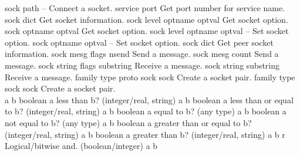 \begin{longtable}{}
\optableent
	{sock path}
	{{\bf {}}}
	{--}
	{Connect a socket.}
\hline
\optableent
	{service}
	{{\bf {}}}
	{port}
	{Get port number for service name.}
\hline
\optableent
	{sock}
	{{\bf {}}}
	{dict}
	{Get socket information.}
\hline
\optableent
	{sock level optname}
	{{\bf {}}}
	{optval}
	{Get socket option.}
\optableent
	{sock optname}
	{{\bf {}}}
	{optval}
	{Get socket option.}
\hline
\optableent
	{sock level optname optval}
	{{\bf {}}}
	{--}
	{Set socket option.}
\optableent
	{sock optname optval}
	{{\bf {}}}
	{--}
	{Set socket option.}
\hline
\optableent
	{sock}
	{{\bf {}}}
	{dict}
	{Get peer socket information.}
\hline
\optableent
	{sock mesg flags}
	{{\bf {}}}
	{nsend}
	{Send a message.}
\optableent
	{sock mesg}
	{{\bf {}}}
	{count}
	{Send a message.}
\hline
\optableent
	{sock string flags}
	{{\bf {}}}
	{substring}
	{Receive a message.}
\optableent
	{sock string}
	{{\bf {}}}
	{substring}
	{Receive a message.}
\hline
\optableent
	{family type proto}
	{{\bf {}}}
	{sock sock}
	{Create a socket pair.}
\optableent
	{family type}
	{{\bf {}}}
	{sock sock}
	{Create a socket pair.}
\hline \hline
{} \\
\hline \hline
\optableent
	{a b}
	{{\bf {}}}
	{boolean}
	{a less than b? (integer/real, string)}
\hline
\optableent
	{a b}
	{{\bf {}}}
	{boolean}
	{a less than or equal to b? (integer/real, string)}
\hline
\optableent
	{a b}
	{{\bf {}}}
	{boolean}
	{a equal to b? (any type)}
\hline
\optableent
	{a b}
	{{\bf {}}}
	{boolean}
	{a not equal to b? (any type)}
\hline
\optableent
	{a b}
	{{\bf {}}}
	{boolean}
	{a greater than or equal to b? (integer/real, string)}
\hline
\optableent
	{a b}
	{{\bf {}}}
	{boolean}
	{a greater than b? (integer/real, string)}
\hline
\optableent
	{a b}
	{{\bf {}}}
	{r}
	{Logical/bitwise and. (boolean/integer) }
\hline
\optableent
	{a b}
	{{\bf {}}}

\end{longtable}
